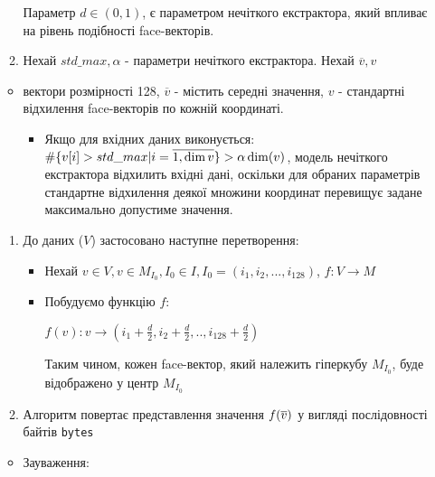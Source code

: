 \documentclass[11pt]{article}
\providecommand{\tightlist}{%
      \setlength{\itemsep}{0pt}\setlength{\parskip}{0pt}}
\def\gt{>}
\begin{document}
\begin{itemize}
\begin{enumerate}
    Параметр \(d \in (0,1)\), є параметром нечіткого екстрактора, який
    впливає на рівень подібності face-векторів.
  \item
    Нехай \(std\_max,\alpha\) - параметри нечіткого екстрактора.
    Нехай \(\overline{v},\overset{\text{~}}{v}\)
  \end{enumerate}

  \begin{itemize}
  \tightlist
  \item
    вектори розмірності 128, \(\overline{v}\) - містить середні
    значення, \(\overset{\text{~}}{v}\) - стандартні відхилення
    face-векторів по кожній координаті.

    \begin{itemize}
    \tightlist
    \item
      Якщо для вхідних даних виконується:
      \(\#\{\overset{\text{~}}{v}[i]>std\_max\space|\space i = \overline{\small{1,\dim{\overset{\text{~}}{v}}}}\} \gt  \alpha \dim(\overset{\text{~}}{v})\),
      модель нечіткого екстрактора відхилить вхідні дані, оскільки для
      обраних параметрів стандартне відхилення деякої множини координат
      перевищує задане максимально допустиме значення.
    \end{itemize}
  \end{itemize}

  \begin{enumerate}
  \def\labelenumi{\arabic{enumi}.}
  \setcounter{enumi}{2}
  \tightlist
  \item
    До даних (\(V\)) застосовано наступне перетворення:

    \begin{itemize}
    \item
      Нехай
      \(v \in V, v \in M_{I_0}, I_0 \in I, I_0 = (i_1,i_2,...,i_{128})\),
      \(f: V \rightarrow M\)
    \item
      Побудуємо функцію \(f\):

      \(f(v): v \longrightarrow (i_1+\frac{d}{2},i_2+\frac{d}{2},..,i_{128}+\frac{d}{2})\)

      Таким чином, кожен face-вектор, який належить гіперкубу
      \(M_{I_0}\), буде відображено у центр \(M_{I_0}\)
    \end{itemize}
  \item
    Алгоритм повертає представлення значення
    \(f(\space\overline{v}\space)\) у вигляді послідовності байтів
    \texttt{bytes}
  \end{enumerate}

  \begin{itemize}
  \tightlist
  \item
    Зауваження:


\end{itemize}
\end{itemize}
\end{document}
